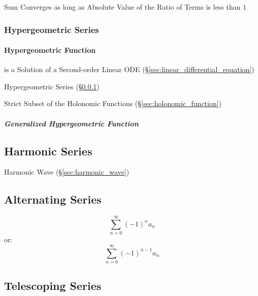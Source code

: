 Sum Converges as long as Absolute Value of the Ratio of Terms is less
than $1$



\subsubsection{Hypergeometric Series}\label{sec:hypergeometric_series}

\paragraph{Hypergeometric Function}\label{sec:hypergeometric_function}\hfill

is a Solution of a Second-order Linear ODE
(\S\ref{sec:linear_differential_equation})

Hypergeometric Series (\S\ref{sec:hypergeometric_series})

Strict Subset of the Holonomic Functions (\S\ref{sec:holonomic_function})



\subparagraph{Generalized Hypergeometric Function}
\label{sec:generalized_hypergeometric_function}\hfill



\subsection{Harmonic Series}\label{sec:harmonic_series}

\fist Harmonic Wave (\S\ref{sec:harmonic_wave})



\subsection{Alternating Series}\label{sec:alternating_series}

\[
  \sum_{n=0}^\infty (-1)^n a_n
\]
or:
\[
  \sum_{n=0}^\infty (-1)^{n-1} a_n
\]



\subsection{Telescoping Series}\label{sec:telescoping_series}


